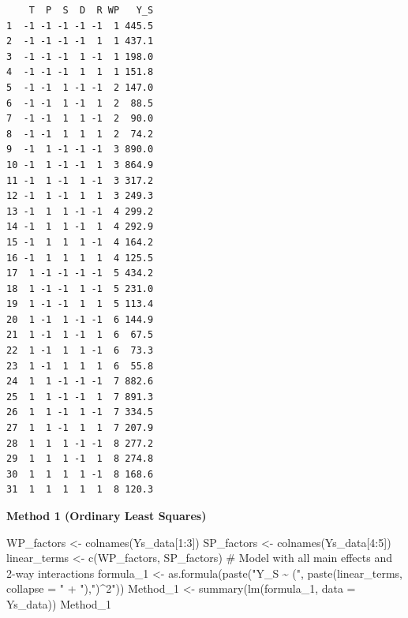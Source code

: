 \documentclass[
  letterpaper,
  DIV=11,
  numbers=noendperiod]{scrartcl}
\newenvironment{Shaded}{\begin{snugshade}}{\end{snugshade}}
\newcommand{\AttributeTok}[1]{\textcolor[rgb]{0.40,0.45,0.13}{#1}}
\newcommand{\CommentTok}[1]{\textcolor[rgb]{0.37,0.37,0.37}{#1}}
\newcommand{\DecValTok}[1]{\textcolor[rgb]{0.68,0.00,0.00}{#1}}
\newcommand{\FunctionTok}[1]{\textcolor[rgb]{0.28,0.35,0.67}{#1}}
\newcommand{\NormalTok}[1]{\textcolor[rgb]{0.00,0.23,0.31}{#1}}
\newcommand{\OtherTok}[1]{\textcolor[rgb]{0.00,0.23,0.31}{#1}}
\newcommand{\SpecialCharTok}[1]{\textcolor[rgb]{0.37,0.37,0.37}{#1}}
\newcommand{\StringTok}[1]{\textcolor[rgb]{0.13,0.47,0.30}{#1}}
\begin{document}
\begin{verbatim}
    T  P  S  D  R WP   Y_S
1  -1 -1 -1 -1 -1  1 445.5
2  -1 -1 -1 -1  1  1 437.1
3  -1 -1 -1  1 -1  1 198.0
4  -1 -1 -1  1  1  1 151.8
5  -1 -1  1 -1 -1  2 147.0
6  -1 -1  1 -1  1  2  88.5
7  -1 -1  1  1 -1  2  90.0
8  -1 -1  1  1  1  2  74.2
9  -1  1 -1 -1 -1  3 890.0
10 -1  1 -1 -1  1  3 864.9
11 -1  1 -1  1 -1  3 317.2
12 -1  1 -1  1  1  3 249.3
13 -1  1  1 -1 -1  4 299.2
14 -1  1  1 -1  1  4 292.9
15 -1  1  1  1 -1  4 164.2
16 -1  1  1  1  1  4 125.5
17  1 -1 -1 -1 -1  5 434.2
18  1 -1 -1  1 -1  5 231.0
19  1 -1 -1  1  1  5 113.4
20  1 -1  1 -1 -1  6 144.9
21  1 -1  1 -1  1  6  67.5
22  1 -1  1  1 -1  6  73.3
23  1 -1  1  1  1  6  55.8
24  1  1 -1 -1 -1  7 882.6
25  1  1 -1 -1  1  7 891.3
26  1  1 -1  1 -1  7 334.5
27  1  1 -1  1  1  7 207.9
28  1  1  1 -1 -1  8 277.2
29  1  1  1 -1  1  8 274.8
30  1  1  1  1 -1  8 168.6
31  1  1  1  1  1  8 120.3
\end{verbatim}

\textbf{Method 1 (Ordinary Least Squares)}

\begin{Shaded}
\begin{Highlighting}[]
\NormalTok{WP\_factors }\OtherTok{\textless{}{-}} \FunctionTok{colnames}\NormalTok{(Ys\_data[}\DecValTok{1}\SpecialCharTok{:}\DecValTok{3}\NormalTok{])}
\NormalTok{SP\_factors }\OtherTok{\textless{}{-}} \FunctionTok{colnames}\NormalTok{(Ys\_data[}\DecValTok{4}\SpecialCharTok{:}\DecValTok{5}\NormalTok{])}
\NormalTok{linear\_terms }\OtherTok{\textless{}{-}} \FunctionTok{c}\NormalTok{(WP\_factors, SP\_factors)}
\CommentTok{\# Model with all main effects and 2{-}way interactions}
\NormalTok{formula\_1 }\OtherTok{\textless{}{-}} \FunctionTok{as.formula}\NormalTok{(}\FunctionTok{paste}\NormalTok{(}\StringTok{"Y\_S \textasciitilde{} ("}\NormalTok{, }
    \FunctionTok{paste}\NormalTok{(linear\_terms, }\AttributeTok{collapse =} \StringTok{" + "}\NormalTok{),}\StringTok{")\^{}2"}\NormalTok{))}
\NormalTok{Method\_1 }\OtherTok{\textless{}{-}} \FunctionTok{summary}\NormalTok{(}\FunctionTok{lm}\NormalTok{(formula\_1, }\AttributeTok{data =}\NormalTok{ Ys\_data))}
\NormalTok{Method\_1}
\end{Highlighting}
\end{Shaded}
\end{document}
